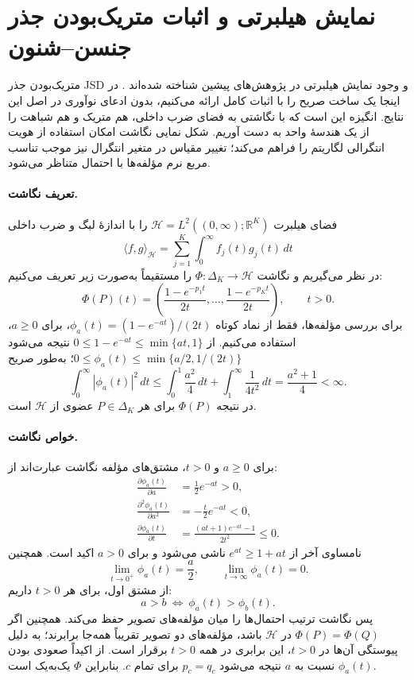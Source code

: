 \section{نمایش هیلبرتی و اثبات متریک‌بودن جذر جنسن--شنون}
\label{app:probability-dissimilarity-proofs}
متریک‌بودن جذر JSD و وجود نمایش هیلبرتی در پژوهش‌های پیشین شناخته شده‌اند \cite{EndresSchindelin2003,FugledeTopsoe2004}. در اینجا یک ساخت صریح را با اثبات کامل ارائه می‌کنیم، بدون ادعای نوآوری در اصل این نتایج. انگیزه این است که با نگاشتی به فضای ضرب داخلی، هم متریک و هم شباهت را از یک هندسهٔ واحد به دست آوریم. شکل نمایی نگاشت امکان استفاده از هویت انتگرالی لگاریتم را فراهم می‌کند؛ تغییر مقیاس در متغیر انتگرال نیز موجب تناسب مربع نرم مؤلفه‌ها با احتمال متناظر می‌شود.

\paragraph{تعریف نگاشت.}
فضای هیلبرت
$\mathcal H=L^2((0,\infty);\mathbb R^K)$
را با اندازهٔ لبگ و ضرب داخلی
\[
\langle f,g\rangle_{\mathcal H}=\sum_{j=1}^K\int_0^\infty f_j(t)g_j(t)\,dt
\]
در نظر می‌گیریم و نگاشت
$\Phi:\Delta_K\longrightarrow\mathcal H$ را مستقیماً به‌صورت زیر تعریف می‌کنیم:
\begin{equation}\label{cmp:eq:ch3-js-Hilbert-map}
\boxed{
\Phi(P)(t)=
\left(\frac{1-e^{-p_1t}}{2t},\ldots,
\frac{1-e^{-p_Kt}}{2t}\right),\qquad t>0.
}
\end{equation}
برای بررسی مؤلفه‌ها، فقط از نماد کوتاه
$\phi_a(t)=(1-e^{-at})/(2t)$، برای $a\ge0$، استفاده می‌کنیم. از
$0\le1-e^{-at}\le\min\{at,1\}$ نتیجه می‌شود
$0\le\phi_a(t)\le\min\{a/2,1/(2t)\}$؛ به‌طور صریح
\[
\int_0^\infty|\phi_a(t)|^2\,dt
\le \int_0^1\frac{a^2}{4}\,dt+\int_1^\infty\frac{1}{4t^2}\,dt
=\frac{a^2+1}{4}<\infty.
\] در نتیجه $\Phi(P)$ برای هر $P\in\Delta_K$ عضوی از $\mathcal H$ است.

\paragraph{خواص نگاشت.}
برای $a\ge0$ و $t>0$، مشتق‌های مؤلفه نگاشت عبارت‌اند از:
\begin{equation}\label{eq:app-ch3-js-map-derivatives}
\begin{aligned}
\frac{\partial\phi_a(t)}{\partial a}
&=\frac12e^{-at}>0,\\
\frac{\partial^2\phi_a(t)}{\partial a^2}
&=-\frac t2e^{-at}<0,\\
\frac{\partial\phi_a(t)}{\partial t}
&=\frac{(at+1)e^{-at}-1}{2t^2}\le0.
\end{aligned}
\end{equation}
نامساوی آخر از $e^{at}\ge1+at$ ناشی می‌شود و برای $a>0$ اکید است. همچنین
\[
\lim_{t\to0^+}\phi_a(t)=\frac a2,\qquad
\lim_{t\to\infty}\phi_a(t)=0.
\]
از مشتق اول، برای هر $t>0$ داریم:
\[
a>b\ \Longleftrightarrow\ \phi_a(t)>\phi_b(t).
\]
پس نگاشت ترتیب احتمال‌ها را میان مؤلفه‌های تصویر حفظ می‌کند. همچنین اگر
$\Phi(P)=\Phi(Q)$ در $\mathcal H$ باشد، مؤلفه‌های دو تصویر تقریباً همه‌جا برابرند؛ به دلیل پیوستگی آن‌ها در $t>0$، این برابری در همه $t>0$ برقرار است. از اکیداً صعودی بودن $\phi_a(t)$ نسبت به $a$ نتیجه می‌شود $p_c=q_c$ برای تمام $c$. بنابراین $\Phi$ یک‌به‌یک است.

